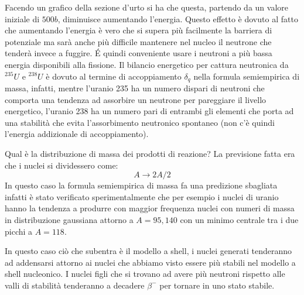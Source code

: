 Facendo un grafico della sezione d'urto si ha che questa, partendo da un valore iniziale di $500b$, diminuisce aumentando l'energia.
Questo effetto è dovuto al fatto che aumentando l'energia è vero che si supera più facilmente la barriera di potenziale ma sarà anche più difficile mantenere nel nucleo il neutrone che tenderà invece a fuggire.
\'E quindi conveniente usare i neutroni a più bassa energia disponibili alla fissione.
Il bilancio energetico per cattura neutronica da $^{235}U$ e $^{238}U$ è dovuto al termine di accoppiamento $\delta _q$ nella formula semiempirica di massa, infatti, mentre l'uranio 235 ha un numero dispari di neutroni che comporta una tendenza ad assorbire un neutrone per pareggiare il livello energetico, l'uranio 238 ha un numero pari di entrambi gli elementi che porta ad una stabilità che evita l'assorbimento neutronico spontaneo (non c'è quindi l'energia addizionale di accoppiamento).

Qual è la distribuzione di massa dei prodotti di reazione?
La previsione fatta era che i nuclei si dividessero come:
\[
A\longrightarrow 2A/2
\]
In questo caso la formula semiempirica di massa fa una predizione sbagliata infatti è stato verificato sperimentalmente che per esempio i nuclei di uranio hanno la tendenza a produrre con maggior frequenza nuclei con numeri di massa in distribuzione gaussiana attorno a $A=95,140$ con un minimo centrale tra i due picchi a $A=118$.

In questo caso ciò che subentra è il modello a shell, i nuclei generati tenderanno ad addensarsi attorno ai nuclei che abbiamo visto essere più stabili nel modello a shell nucleonico.
I nuclei figli che si trovano ad avere più neutroni rispetto alle valli di stabilità tenderanno a decadere $\beta^-$ per tornare in uno stato stabile.

